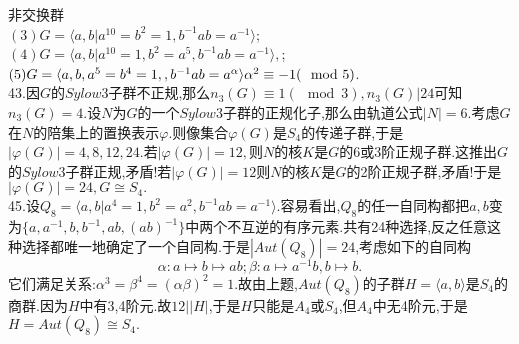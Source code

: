 \documentclass[b5paper]{ctexart}
\begin{document}
非交换群\\
$(3)G=\langle a,b|a^{10}=b^2=1,b^{-1}ab=a^{-1}\rangle$;\\
$(4)G=\langle a,b|a^{10}=1,b^2=a^5,b^{-1}ab=a^{-1}\rangle,$;$\\
(5)G=\langle a,b,a^5=b^4=1,,b^{-1}ab=a^{\alpha}\rangle\alpha^2\equiv -1(\mod 5)$.\\
43.因$G$的$Sylow$3子群不正规,那么$n_3(G)\equiv 1(\mod 3),n_3(G)|24$可知$n_3(G)=4.$设$N$为$G$的一个$Sylow$3子群的正规化子,那么由轨道公式$|N|=6$.考虑$G$在$N$的陪集上的置换表示$\varphi$.则像集合$\varphi(G)$是$S_4$的传递子群,于是$|\varphi(G)|=4,8,12,24$.若$|\varphi(G)|=12,$则$N$的核$K$是$G$的6或3阶正规子群.这推出$G$的$Sylow$3子群正规,矛盾!若$|\varphi(G)|=12$则$N$的核$K$是$G$的2阶正规子群,矛盾!于是$|\varphi(G)|=24,G\cong S_4.$\\
45.设$Q_8=\langle a,b|a^4=1,b^2=a^2,b^{-1}ab=a^{-1}\rangle.$容易看出,$Q_8$的任一自同构都把$a,b$变为$\{a,a^{-1},b,b^{-1},ab,(ab)^{-1}\}$中两个不互逆的有序元素.共有24种选择,反之任意这种选择都唯一地确定了一个自同构.于是$|Aut(Q_8)|=24$,考虑如下的自同构
\[\alpha:a\mapsto b\mapsto ab;\beta: a\mapsto a^{-1}b,b\mapsto b.\]
它们满足关系:$\alpha^3=\beta^4=(\alpha\beta)^2=1$.故由上题,$Aut(Q_8)$的子群$H=\langle a,b\rangle$是$S_4$的商群.因为$H$中有3,4阶元.故$12||H|$,于是$H$只能是$A_4$或$S_4$,但$A_4$中无4阶元,于是$H=Aut(Q_8)\cong S_4.$
\end{document}
